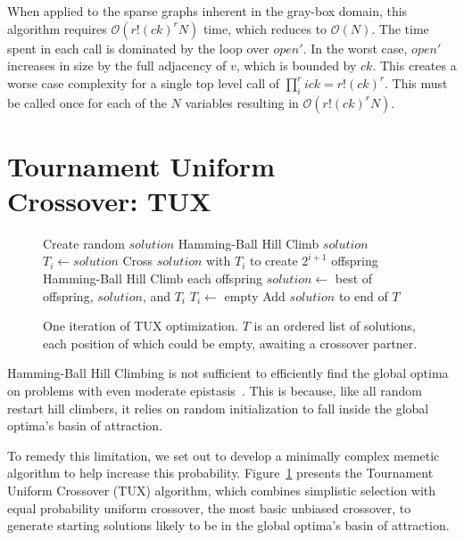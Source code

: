 \documentclass{sig-alternate}
\newcommand{\BigO}[1]{$\mathcal{O}{(#1)}$}
\begin{document}
When applied to the sparse graphs inherent in the gray-box domain, this algorithm
requires \BigO{r!(ck)^rN} time, which reduces to \BigO{N}. The time spent
in each call is dominated by the loop over $open'$. In the worst case, $open'$
increases in size by the full adjacency of $v$, which is bounded by $ck$.
This creates a worse case complexity for a single top level call of
$\prod_{i}^{r} ick = r!(ck)^r$. This must be called once for each
of the $N$ variables resulting in \BigO{r!(ck)^rN}.

\section{Tournament Uniform\\ Crossover: TUX}
\label{sec-tux}
\begin{figure}
  \begin{algorithmic}[1]
    \State Create random $solution$
    \State Hamming-Ball Hill Climb $solution$
        \State $T_i \leftarrow solution$
        \State \Return
      \EndIf
      \State Cross $solution$ with $T_i$ to create $2^{i+1}$ offspring
      \State Hamming-Ball Hill Climb each offspring
      \State $solution \leftarrow$ best of offspring, $solution$, and $T_i$
      \State $T_i \leftarrow$ empty
    \EndFor
    \State Add $solution$ to end of $T$
  \EndProcedure
\end{algorithmic}
  \caption{One iteration of TUX optimization. $T$ is an
           ordered list of solutions, each position of which could be empty,
           awaiting a crossover partner.}
  \label{fig-TUX}
\end{figure}

Hamming-Ball Hill Climbing is not sufficient to efficiently find the global optima
on problems with even moderate epistasis~\cite{chicano:2014:ball}. This is because,
like all random restart hill climbers, it relies on random initialization to fall
inside the global optima's basin of attraction.

To remedy this limitation, we set out to develop a minimally complex memetic
algorithm to help increase this probability. Figure~\ref{fig-TUX} presents
the Tournament Uniform Crossover (TUX) algorithm, which combines simplistic
selection with equal probability uniform crossover, the most basic unbiased crossover, to generate starting
solutions likely to be in the global optima's basin of attraction.
\end{document}
